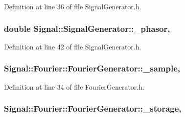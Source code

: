 Definition at line 36 of file Signal\+Generator.\+h.

\hypertarget{classSignal_1_1SignalGenerator_af4aa0728ded00777be26a06d883eaeb3}{
\subsubsection[{\+\_\+phasor}]{\setlength{\rightskip}{0pt plus 5cm}double Signal\+::\+Signal\+Generator\+::\+\_\+phasor\hspace{0.3cm}{\ttfamily [protected]}, {\ttfamily [inherited]}}}\label{classSignal_1_1SignalGenerator_af4aa0728ded00777be26a06d883eaeb3}


Definition at line 42 of file Signal\+Generator.\+h.

\hypertarget{classSignal_1_1Fourier_1_1FourierGenerator_ad720bf2b268dc621ace64c54c0816597}{
\subsubsection[{\+\_\+sample}]{ Signal\+::\+Fourier\+::\+Fourier\+Generator\+::\+\_\+sample\hspace{0.3cm}{\ttfamily [protected]}, {\ttfamily [inherited]}}}\label{classSignal_1_1Fourier_1_1FourierGenerator_ad720bf2b268dc621ace64c54c0816597}


Definition at line 34 of file Fourier\+Generator.\+h.

\hypertarget{classSignal_1_1Fourier_1_1FourierGenerator_ab6e6b79cf56e31c9a1b5766f357f8cfb}{
\subsubsection[{\+\_\+storage}]{ Signal\+::\+Fourier\+::\+Fourier\+Generator\+::\+\_\+storage\hspace{0.3cm}{\ttfamily [protected]}, {\ttfamily [inherited]}}}\label{classSignal_1_1Fourier_1_1FourierGenerator_ab6e6b79cf56e31c9a1b5766f357f8cfb}


